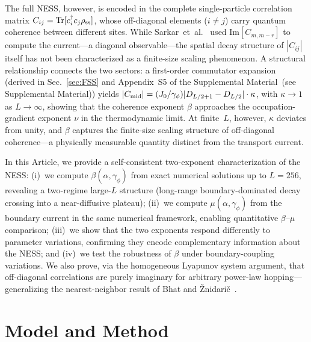 \documentclass[aps,prb,twocolumn,superscriptaddress,floatfix]{revtex4-2}
\begin{document}
The full NESS, however, is encoded in the complete single-particle correlation matrix $C_{ij} = \mathrm{Tr}[c_i^\dagger c_j \rho_{\rm ss}]$, whose off-diagonal elements ($i \neq j$) carry quantum coherence between different sites. While Sarkar~et~al.~\cite{Sarkar2024} used $\mathrm{Im}[C_{m,m-r}]$ to compute the current---a diagonal observable---the spatial decay structure of $|C_{ij}|$ itself has not been characterized as a finite-size scaling phenomenon. A structural relationship connects the two sectors: a first-order commutator expansion (derived in Sec.~\ref{sec:FSS} and Appendix~S5 of the Supplemental Material~(see Supplemental Material)) yields $|C_{\rm mid}| = (J_0/\gamma_\phi) |D_{L/2+1} - D_{L/2}| \cdot \kappa$, with $\kappa \to 1$ as $L \to \infty$, showing that the coherence exponent $\beta$ approaches the occupation-gradient exponent $\nu$ in the thermodynamic limit. At finite~$L$, however, $\kappa$ deviates from unity, and $\beta$ captures the finite-size scaling structure of off-diagonal coherence---a physically measurable quantity distinct from the transport current.

In this Article, we provide a self-consistent two-exponent characterization of the NESS: (i)~we compute $\beta(\alpha,\gamma_\phi)$ from exact numerical solutions up to $L=256$, revealing a two-regime large-$L$ structure (long-range boundary-dominated decay crossing into a near-diffusive plateau); (ii)~we compute $\mu(\alpha,\gamma_\phi)$ from the boundary current in the same numerical framework, enabling quantitative $\beta$--$\mu$ comparison; (iii)~we show that the two exponents respond differently to parameter variations, confirming they encode complementary information about the NESS; and (iv)~we test the robustness of $\beta$ under boundary-coupling variations. We also prove, via the homogeneous Lyapunov system argument, that off-diagonal correlations are purely imaginary for arbitrary power-law hopping---generalizing the nearest-neighbor result of Bhat and \v{Z}nidari\v{c}~\cite{Bhat2025}.

\section{Model and Method}
\label{sec:model}
\end{document}

